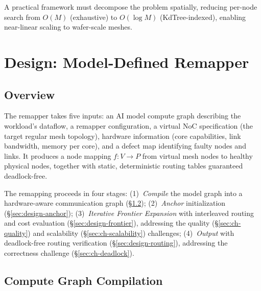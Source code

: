 \documentclass[sigplan,anonymous,review,nonacm]{acmart}
\begin{document}
A practical framework must decompose the problem spatially, reducing per-node search from $O(M)$ (exhaustive) to $O(\log M)$ (KdTree-indexed), enabling near-linear scaling to wafer-scale meshes.


\section{Design: Model-Defined Remapper}
\label{sec:design}


\subsection{Overview}
\label{sec:design-overview}


The remapper takes five inputs: an AI model compute graph describing the workload's dataflow, a remapper configuration, a virtual NoC specification (the target regular mesh topology), hardware information (core capabilities, link bandwidth, memory per core), and a defect map identifying faulty nodes and links. It produces a node mapping $f: V \to P$ from virtual mesh nodes to healthy physical nodes, together with static, deterministic routing tables guaranteed deadlock-free.

The remapping proceeds in four stages: (1)~\emph{Compile} the model graph into a hardware-aware communication graph (\S\ref{sec:design-compile}); (2)~\emph{Anchor} initialization (\S\ref{sec:design-anchor}); (3)~\emph{Iterative Frontier Expansion} with interleaved routing and cost evaluation (\S\ref{sec:design-frontier}), addressing the quality (\S\ref{sec:ch-quality}) and scalability (\S\ref{sec:ch-scalability}) challenges; (4)~\emph{Output} with deadlock-free routing verification (\S\ref{sec:design-routing}), addressing the correctness challenge (\S\ref{sec:ch-deadlock}).


\subsection{Compute Graph Compilation}
\label{sec:design-compile}
\end{document}
